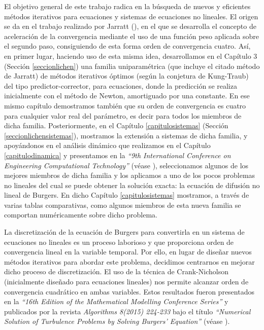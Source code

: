 El objetivo general de este trabajo radica en la búsqueda de nuevos y eficientes métodos iterativos para ecuaciones y sistemas de ecuaciones no lineales. El origen se da en el trabajo realizado por Jarratt (\cite{Jarratt}), en el que se desarrolla el concepto de aceleración de la convergencia mediante el uso de una función peso aplicada sobre el segundo paso, consiguiendo de esta forma orden de convergencia cuatro. Así, en primer lugar, haciendo uso de esta misma idea, desarrollamos en el Capítulo 3 (Sección \ref{seccionlichen}) una familia uniparamétrica (que incluye el citado método de Jarratt) de métodos iterativos óptimos (según la conjetura de Kung-Traub) del tipo predictor-corrector, para ecuaciones, donde la predicción se realiza inicialmente con el método de Newton, amortiguado por una constante. En ese mismo capítulo demostramos también que su orden de convergencia es cuatro para cualquier valor real del parámetro, es decir para todos los miembros de dicha familia. Posteriormente, en el Capítulo \ref{capitulosistemas} (Sección \ref{seccionlichensistemas}), mostramos la extensión a sistemas de dicha familia, y apoyándonos en el análisis dinámico que realizamos en el Capítulo \ref{capitulodinamica} y presentamos en la \textit{``9th International Conference on Engineering Computational	Technology''} (véase \cite{napoles}), seleccionamos algunos de los mejores miembros de dicha familia y los aplicamos a uno de los pocos problemas no lineales del cual se puede obtener la solución exacta: la ecuación de difusión no lineal de Burgers. En dicho Capítulo \ref{capitulosistemas} mostramos, a través de varias tablas comparativas, como algunos miembros de esta nueva familia se comportan numéricamente sobre dicho problema.

La discretización de la ecuación de Burgers para convertirla en un sistema de ecuaciones no lineales es un proceso laborioso y que proporciona orden de convergencia lineal en la variable temporal. Por ello, en lugar de diseñar nuevos métodos iterativos para abordar este problema, decidimos centrarnos en mejorar dicho proceso de discretización. El uso de la técnica de Crank-Nicholson (inicialmente diseñado para ecuaciones lineales) nos permite alcanzar orden de convergencia cuadrático en ambas variables. Estos resultados fueron presentados en la \textit{``16th Edition of the	Mathematical Modelling Conference Series''} y publicados por la revista \textit{Algorithms 8(2015) 224-233} bajo el título \textit{``Numerical Solution of Turbulence Problems by Solving
Burgers’ Equation''} (véase \cite{paperburgers}).

